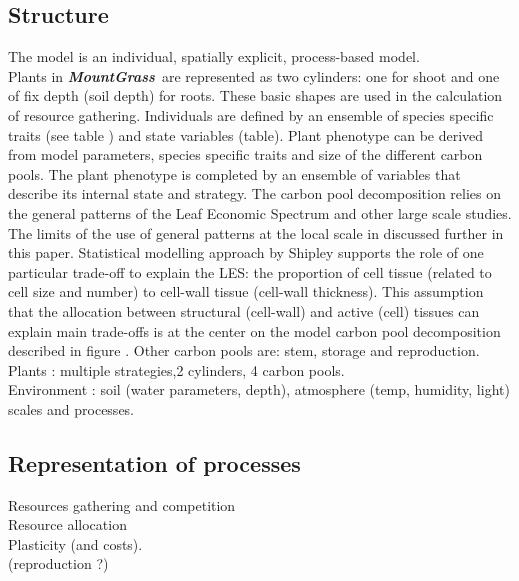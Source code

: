 \documentclass[review]{elsarticle}
\newcommand{\model}{\textbf{\textit{MountGrass}}~}
\begin{document}
\subsection{Structure}
The model is an individual, spatially explicit, process-based model.\\
Plants in \model are represented as two cylinders: one for shoot and one of fix depth (soil depth) for roots. These basic shapes are used in the calculation of resource gathering. Individuals are defined by an ensemble of species specific traits (see table ) and state variables (table). Plant phenotype can be derived from model parameters, species specific traits and size of the different carbon pools. The plant phenotype is completed by an ensemble of variables that describe its internal state and strategy. The carbon pool decomposition relies on the general patterns of the Leaf Economic Spectrum and other large scale studies. The limits of the use of general patterns at the local scale in discussed further in this paper. Statistical modelling approach by Shipley supports the role of one particular trade-off to explain the LES: the proportion of cell tissue (related to cell size and number) to cell-wall tissue (cell-wall thickness). This assumption that the allocation between structural (cell-wall) and active (cell) tissues can explain main trade-offs is at the center on the model carbon pool decomposition described in figure . Other carbon pools are: stem, storage and reproduction. %
Plants : multiple strategies,2 cylinders, 4 carbon pools.\\
Environment : soil (water parameters, depth), atmosphere (temp, humidity, light)\\
scales and processes.

\subsection{Representation of processes}
Resources gathering and competition\\
Resource allocation\\
Plasticity (and costs).\\
(reproduction ?)\\
\end{document}
